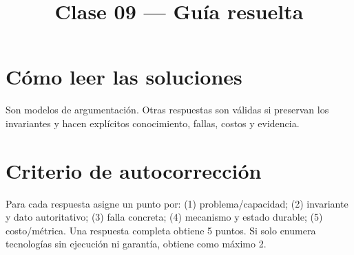 \documentclass[variant=guiaresuelta,cover=institutional,mode=screen]{ua-engineering-v6-article}
\title{Clase 09 --- Guía resuelta}
\author{\UAProfessor}
\date{\UADate}
\begin{document}
\maketitle
\section{Cómo leer las soluciones}
Son modelos de argumentación. Otras respuestas son válidas si preservan los invariantes y hacen explícitos conocimiento, fallas, costos y evidencia.

\section{Criterio de autocorrección}
Para cada respuesta asigne un punto por: (1) problema/capacidad; (2) invariante y dato autoritativo; (3) falla concreta; (4) mecanismo y estado durable; (5) costo/métrica. Una respuesta completa obtiene 5 puntos. Si solo enumera tecnologías sin ejecución ni garantía, obtiene como máximo 2.
\end{document}
